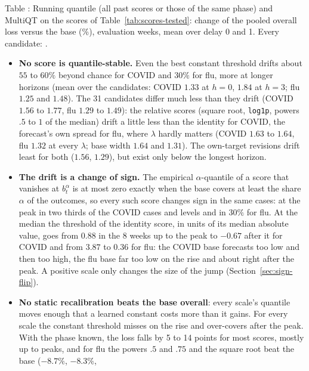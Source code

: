 \documentclass[11pt,a4paper]{article}
\theoremstyle{definition}
\theoremstyle{remark}
\begin{document}
\label{tab:score-selection}
\begin{center}\small Table \thetable: Running quantile (all past scores or
those of the same phase) and MultiQT on the scores of
Table~\ref{tab:scores-tested}: change of the pooled overall loss versus the
base (\%), evaluation weeks, mean over delay 0 and 1. Every candidate:
.
\end{center}

\begin{itemize}[leftmargin=*,itemsep=3pt]
\item \textbf{No score is quantile-stable.} Even the best constant
threshold drifts about $55$ to $60\%$ beyond chance for COVID and $30\%$
for flu, more at longer horizons (mean over the candidates: COVID $1.33$ at
$h=0$, $1.84$ at $h=3$; flu $1.25$ and $1.48$). The 31 candidates differ
much less than they drift (COVID $1.56$ to $1.77$, flu $1.29$ to $1.49$):
the relative scores (square root, \texttt{log1p}, powers $.5$ to $1$ of
the median) drift a little less than the identity for COVID, the
forecast's own spread for flu, where $\lambda$ hardly matters (COVID
$1.63$ to $1.64$, flu $1.32$ at every $\lambda$; base width $1.64$ and
$1.31$). The own-target revisions drift least for both ($1.56$, $1.29$),
but exist only below the longest horizon.
\item \textbf{The drift is a change of sign.} The empirical
$\alpha$-quantile of a score that vanishes at $b_t^\alpha$ is at most zero
exactly when the base covers at least the share $\alpha$ of the outcomes,
so every such score changes sign in the same cases: at the peak in two
thirds of the COVID cases and levels and in $30\%$ for flu. At the median
the threshold of the identity score, in units of its median absolute
value, goes from $0.88$ in the 8 weeks up to the peak to $-0.67$ after it
for COVID and from $3.87$ to $0.36$ for flu: the COVID base forecasts too
low and then too high, the flu base far too low on the rise and about right
after the peak. A positive scale only changes the size of the jump
(Section~\ref{sec:sign-flip}).
\item \textbf{No static recalibration beats the base overall}: every
scale's quantile moves enough that a learned constant costs more than it
gains. For every scale the constant threshold misses on the rise and
over-covers after the peak. With the phase known, the loss falls by 5 to
14 points for most scores, mostly up to peaks, and for flu the powers
$.5$ and $.75$ and the square root beat the base ($-8.7\%$, $-8.3\%$,

\end{itemize}
\end{document}
